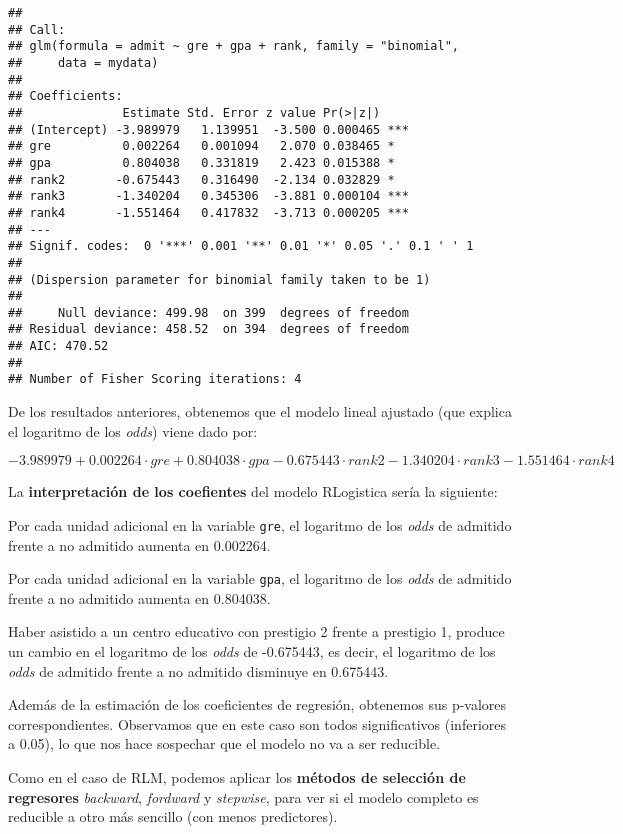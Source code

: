 \documentclass[
]{article}
\begin{document}
\begin{verbatim}
## 
## Call:
## glm(formula = admit ~ gre + gpa + rank, family = "binomial", 
##     data = mydata)
## 
## Coefficients:
##              Estimate Std. Error z value Pr(>|z|)    
## (Intercept) -3.989979   1.139951  -3.500 0.000465 ***
## gre          0.002264   0.001094   2.070 0.038465 *  
## gpa          0.804038   0.331819   2.423 0.015388 *  
## rank2       -0.675443   0.316490  -2.134 0.032829 *  
## rank3       -1.340204   0.345306  -3.881 0.000104 ***
## rank4       -1.551464   0.417832  -3.713 0.000205 ***
## ---
## Signif. codes:  0 '***' 0.001 '**' 0.01 '*' 0.05 '.' 0.1 ' ' 1
## 
## (Dispersion parameter for binomial family taken to be 1)
## 
##     Null deviance: 499.98  on 399  degrees of freedom
## Residual deviance: 458.52  on 394  degrees of freedom
## AIC: 470.52
## 
## Number of Fisher Scoring iterations: 4
\end{verbatim}

De los resultados anteriores, obtenemos que el modelo lineal ajustado
(que explica el logaritmo de los \emph{odds}) viene dado por:

\[
-3.989979+0.002264\cdot gre+0.804038\cdot gpa-0.675443\cdot rank2-1.340204\cdot rank3-1.551464\cdot rank4
\]

La \textbf{interpretación de los coefientes} del modelo RLogistica sería
la siguiente:

Por cada unidad adicional en la variable \texttt{gre}, el logaritmo de
los \emph{odds} de admitido frente a no admitido aumenta en 0.002264.

Por cada unidad adicional en la variable \texttt{gpa}, el logaritmo de
los \emph{odds} de admitido frente a no admitido aumenta en 0.804038.

Haber asistido a un centro educativo con prestigio 2 frente a prestigio
1, produce un cambio en el logaritmo de los \emph{odds} de -0.675443, es
decir, el logaritmo de los \emph{odds} de admitido frente a no admitido
disminuye en 0.675443.

Además de la estimación de los coeficientes de regresión, obtenemos sus
p-valores correspondientes. Observamos que en este caso son todos
significativos (inferiores a 0.05), lo que nos hace sospechar que el
modelo no va a ser reducible.

Como en el caso de RLM, podemos aplicar los \textbf{métodos de selección
de regresores} \emph{backward}, \emph{fordward} y \emph{stepwise}, para
ver si el modelo completo es reducible a otro más sencillo (con menos
predictores).
\end{document}
